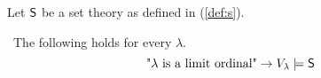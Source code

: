 Let $\sf{S}$ be a set theory as defined in (\ref{def:s}). %
\begin{lemma}\label{lemma:scm_s_is_limit}\
The following holds for every $\lambda$.
\begin{equation}
\mbox{"$\lambda$ is a limit ordinal"} \rightarrow V_\lambda \models \sf{S}
\end{equation}
\end{lemma}

